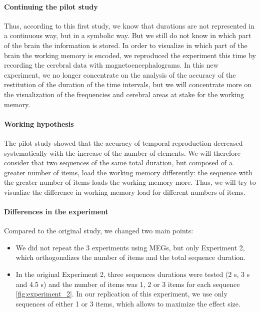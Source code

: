 \paragraph{Continuing the pilot study}
Thus, according to this first study, we know that durations are not represented in a continuous way, but in a symbolic way. But we still do not know in which part of the brain the information is stored. In order to visualize in which part of the brain the working memory is encoded, we reproduced the experiment this time by recording the cerebral data with magnetoencephalograms. In this new experiment, we no longer concentrate on the analysis of the accuracy of the restitution of the duration of the time intervals, but we will concentrate more on the visualization of the frequencies and cerebral areas at stake for the working memory.

\paragraph{Working hypothesis}
The pilot study showed that the accuracy of temporal reproduction decreased systematically with the increase of the number of elements. We will therefore consider that two sequences of the same total duration, but composed of a greater number of items, load the working memory differently: the sequence with the greater number of items loads the working memory more. Thus, we will try to visualize the difference in working memory load for different numbers of items.

\paragraph{Differences in the experiment}
Compared to the original study, we changed two main points:

\begin{itemize}
   \item We did not repeat the 3 experiments using MEGs, but only Experiment 2, which orthogonalizes the number of items and the total sequence duration.
   \item In the original Experiment 2, three sequences durations were tested (2 s, 3 s and 4.5 s) and the number of items was 1, 2 or 3 items for each sequence \ref{fig:experiment_2}. In our replication of this experiment, we use only sequences of either 1 or 3 items, which allows to maximize the effect size.
\end{itemize}



